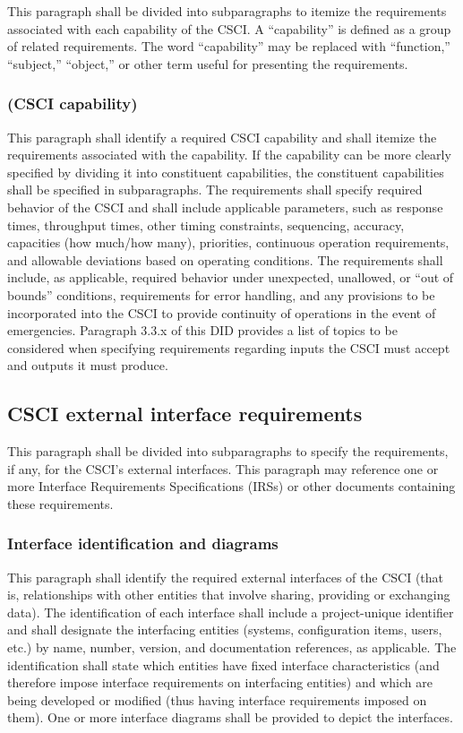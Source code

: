 \documentclass{fidata-report-template}
\begin{document}
This paragraph shall be divided into subparagraphs to itemize the
requirements associated with each capability of the CSCI. A
``capability'' is defined as a group of related requirements. The word
``capability'' may be replaced with ``function,'' ``subject,''
``object,'' or other term useful for presenting the requirements.

\subsubsection{(CSCI capability)}

This paragraph shall identify a required CSCI capability and shall
itemize the requirements associated with the capability. If the
capability can be more clearly specified by dividing it into constituent
capabilities, the constituent capabilities shall be specified in
subparagraphs. The requirements shall specify required behavior of the
CSCI and shall include applicable parameters, such as response times,
throughput times, other timing constraints, sequencing, accuracy,
capacities (how much/how many), priorities, continuous operation
requirements, and allowable deviations based on operating conditions.
The requirements shall include, as applicable, required behavior under
unexpected, unallowed, or ``out of bounds'' conditions, requirements for
error handling, and any provisions to be incorporated into the CSCI to
provide continuity of operations in the event of emergencies. Paragraph
3.3.x of this DID provides a list of topics to be considered when
specifying requirements regarding inputs the CSCI must accept and
outputs it must produce.

\subsection{CSCI external interface requirements}

This paragraph shall be divided into subparagraphs to specify the
requirements, if any, for the CSCI's external interfaces. This paragraph
may reference one or more Interface Requirements Specifications (IRSs)
or other documents containing these requirements.

\subsubsection{Interface identification and diagrams}

This paragraph shall identify the required external interfaces of the
CSCI (that is, relationships with other entities that involve sharing,
providing or exchanging data). The identification of each interface
shall include a project-unique identifier and shall designate the
interfacing entities (systems, configuration items, users, etc.) by
name, number, version, and documentation references, as applicable. The
identification shall state which entities have fixed interface
characteristics (and therefore impose interface requirements on
interfacing entities) and which are being developed or modified (thus
having interface requirements imposed on them). One or more interface
diagrams shall be provided to depict the interfaces.
\end{document}
